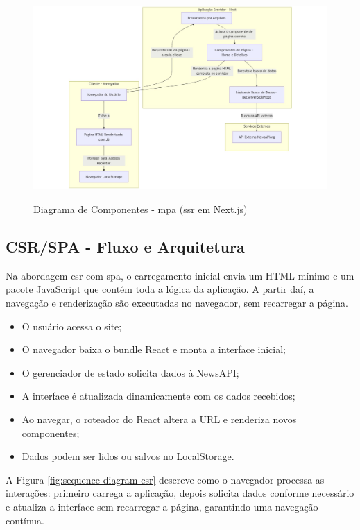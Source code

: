 \begin{figure}[H]
  \centering
  \caption{Diagrama de Componentes - \acrshort{mpa} (\acrshort{ssr} em Next.js)}
  \includegraphics[width=1\textwidth]{media/component-diagram-next.jpeg}
  \label{fig:component-diagram-next}
\end{figure}


\subsection{CSR/SPA - Fluxo e Arquitetura}
\label{subsec:csr-spa}

Na abordagem \acrfull{csr} com \acrfull{spa}, o carregamento inicial envia um HTML mínimo e um pacote JavaScript que contém toda a lógica da aplicação. A partir daí, a navegação e renderização são executadas no navegador, sem recarregar a página.

\begin{itemize}
  \item O usuário acessa o site;
  \item O navegador baixa o bundle React e monta a interface inicial;
  \item O gerenciador de estado solicita dados à NewsAPI;
  \item A interface é atualizada dinamicamente com os dados recebidos;
  \item Ao navegar, o roteador do React altera a URL e renderiza novos componentes;
  \item Dados podem ser lidos ou salvos no LocalStorage.
\end{itemize}

A Figura \ref{fig:sequence-diagram-csr} descreve como o navegador processa as interações: primeiro carrega a aplicação, depois solicita dados conforme necessário e atualiza a interface sem recarregar a página, garantindo uma navegação contínua.

